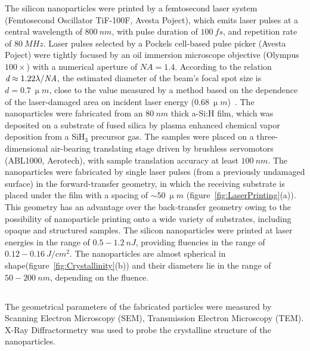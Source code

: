         \subsubsection{}
                The silicon nanoparticles  were printed by a femtosecond laser system (Femtosecond Oscillator TiF-100F, Avesta Poject),
            which emits laser pulses at a central wavelength of $800~\si{nm}$, with pulse duration of $100~\si{fs}$, and repetition rate
            of $80~\si{MHz}$. Laser pulses selected by a Pockels cell-based pulse picker (Avesta Poject) were tightly focused by an
            oil immersion microscope objective (Olympus $100\times$) with a numerical aperture of $\mathit{NA}=1.4$. According to the
            relation $\emph{d}\approx 1.22\lambda/\mathit{NA}$, the estimated diameter of the beam's focal spot size is $d=0.7~\si{\upmu m}$,
            close to the value measured by a method based on the dependence of the laser-damaged area on incident laser energy ($0.68~\si{\upmu m}$)~\cite{liu1982simple}.
    	    The nanoparticles were fabricated from an $80~\si{nm}$ thick a-Si:H film, which was deposited on a substrate of fused silica by
            plasma enhanced chemical vapor deposition from a SiH$_{3}$ precursor gas. The samples were placed on a three-dimensional air-bearing
            translating stage driven by brushless servomotors (ABL1000, Aerotech), with sample translation accuracy at least $100~\si{nm}$.
	        The nanoparticles were fabricated by single laser pulses (from a previously undamaged surface) in the forward-transfer geometry,
            in which the receiving substrate is placed under the film with a spacing of $\sim 50~\si{\upmu m}$ (figure~\ref{fig:LaserPrinting}(a)).
            This geometry has an advantage over the back-transfer geometry owing to the possibility of nanoparticle printing onto a wide
            variety of substrates, including opaque and structured samples. The silicon nanoparticles were printed at laser energies in the
            range of $0.5-1.2~\si{nJ}$, providing fluencies in the range of $0.12-0.16~\si{J/cm^{2}}$. The nanoparticles are almost spherical
            in shape(figure~\ref{fig:Crystallinity}(b)) and their diameters lie in the range of $50-200~\si{nm}$, depending on the fluence.



    \subsection{}
    \label{sec:SEM}
            The geometrical parameters of the fabricated particles were measured by Scanning Electron Microscopy (SEM),
        Transmission Electron Microscopy (TEM). X-Ray Diffractormetry was used to probe the crystalline structure of the
        nanoparticles.
